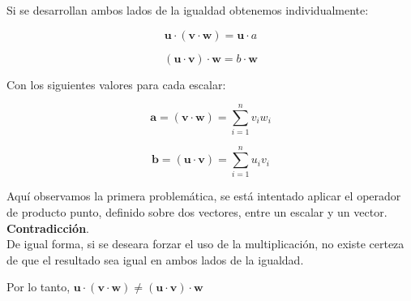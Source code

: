 \documentclass[12 pt]{article}
\begin{document}
Si se desarrollan ambos lados de la igualdad obtenemos individualmente:

\[
\mathbf{u} \cdot (\mathbf{v} \cdot \mathbf{w}) = \mathbf{u} \cdot a
\]

\[
(\mathbf{u} \cdot \mathbf{v}) \cdot \mathbf{w} = b \cdot \mathbf{w}
\]

Con los siguientes valores para cada escalar:

\[
\mathbf{a} = (\mathbf{v} \cdot \mathbf{w}) = \sum_{i=1}^{n} v_i w_i
\]

\[
\mathbf{b} = (\mathbf{u} \cdot \mathbf{v}) = \sum_{i=1}^{n} u_i v_i
\]

Aquí observamos la primera problemática, se está intentado aplicar el operador de producto punto, definido sobre dos vectores, entre un escalar y un vector. \textbf{Contradicción}.\\

De igual forma, si se deseara forzar el uso de la multiplicación, no existe certeza de que el resultado sea igual en ambos lados de la igualdad.

\begin{center}
Por lo tanto, \(\mathbf{u} \cdot (\mathbf{v} \cdot \mathbf{w}) \neq (\mathbf{u} \cdot \mathbf{v}) \cdot \mathbf{w}\)\\
\end{center}
\end{document}
